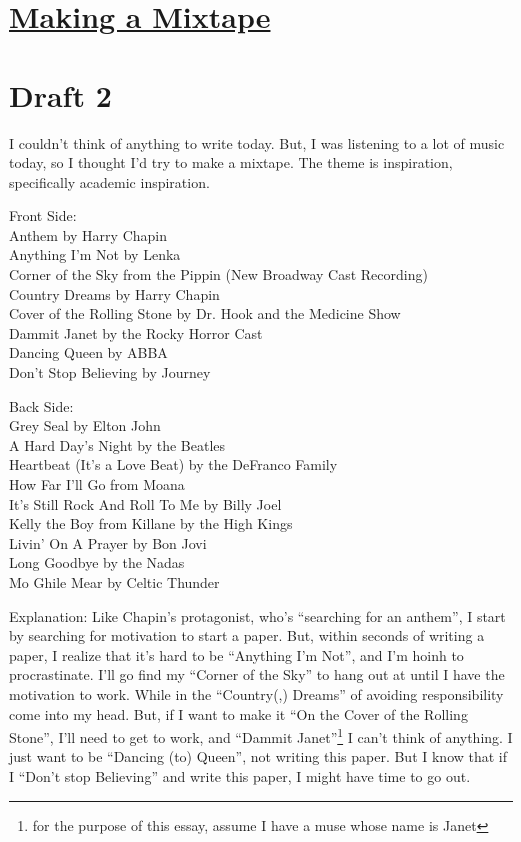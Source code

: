 \documentclass[12pt]{article}[titlepage]
\newcommand{\say}[1]{``#1''}
\newcommand{\1}{\={a}}
\newcommand{\2}{\={e}}
\newcommand{\3}{\={\i}}
\newcommand{\4}{\=o}
\newcommand{\5}{\=u}
\newcommand{\6}{\={A}}
\renewcommand{\,}{\textsuperscript{,}}
\begin{document}
\doublespacing
\section{\href{making-a-mixtape.html}{Making a Mixtape}}
\section{Draft 2}
I couldn't think of anything to write today.
But, I was listening to a lot of music today, so I thought I'd try to make a mixtape.
The theme is inspiration, specifically academic inspiration.

Front Side:\\
Anthem by Harry Chapin\\
Anything I'm Not by Lenka\\
Corner of the Sky from the Pippin (New Broadway Cast Recording)\\
Country Dreams by Harry Chapin\\
Cover of the Rolling Stone by Dr. Hook and the Medicine Show\\
Dammit Janet by the Rocky Horror Cast\\
Dancing Queen by ABBA\\
Don't Stop Believing by Journey

Back Side:\\
Grey Seal by Elton John\\
A Hard Day's Night by the Beatles\\
Heartbeat (It's a Love Beat) by the DeFranco Family\\
How Far I'll Go from Moana\\
It's Still Rock And Roll To Me by Billy Joel\\
Kelly the Boy from Killane by the High Kings\\
Livin' On A Prayer by Bon Jovi\\
Long Goodbye by the Nadas\\
Mo Ghile Mear by Celtic Thunder

Explanation:
Like Chapin's protagonist, who's \say{searching for an anthem}, I start by searching for motivation to start a paper.
But, within seconds of writing a paper, I realize that it's hard to be \say{Anything I'm Not}, and I'm hoinh to procrastinate.
I'll go find my \say{Corner of the Sky} to hang out at until I have the motivation to work.
While in the \say{Country(,) Dreams} of avoiding responsibility come into my head.
But, if I want to make it \say{On the Cover of the Rolling Stone}, I'll need to get to work, and \say{Dammit Janet}\footnote{for the purpose of this essay, assume I have a muse whose name is Janet} I can't think of anything.
I just want to be \say{Dancing (to) Queen}, not writing this paper.
But I know that if I \say{Don't stop Believing} and write this paper, I might have time to go out.
\end{document}
